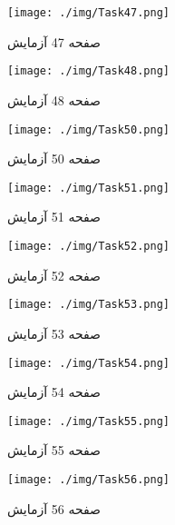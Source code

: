  
\begin{figure}[htpb]
\centering
\texttt{[image: ./img/Task47.png]}
\caption{ صفحه 47 آزمایش }
\label{fig:Task47}
\end{figure}
 
 
\begin{figure}[htpb]
\centering
\texttt{[image: ./img/Task48.png]}
\caption{ صفحه 48 آزمایش }
\label{fig:Task48}
\end{figure}
 

\begin{figure}[htpb]
\centering
\texttt{[image: ./img/Task50.png]}
\caption{ صفحه 50 آزمایش }
\label{fig:Task50}
\end{figure}
 
 
\begin{figure}[htpb]
\centering
\texttt{[image: ./img/Task51.png]}
\caption{ صفحه 51 آزمایش }
\label{fig:Task51}
\end{figure}
 
 
\begin{figure}[htpb]
\centering
\texttt{[image: ./img/Task52.png]}
\caption{ صفحه 52 آزمایش }
\label{fig:Task52}
\end{figure}
 
 
\begin{figure}[htpb]
\centering
\texttt{[image: ./img/Task53.png]}
\caption{ صفحه 53 آزمایش }
\label{fig:Task53}
\end{figure}
 
 
\begin{figure}[htpb]
\centering
\texttt{[image: ./img/Task54.png]}
\caption{ صفحه 54 آزمایش }
\label{fig:Task54}
\end{figure}
 
 
\begin{figure}[htpb]
\centering
\texttt{[image: ./img/Task55.png]}
\caption{ صفحه 55 آزمایش }
\label{fig:Task55}
\end{figure}
 
 
\begin{figure}[htpb]
\centering
\texttt{[image: ./img/Task56.png]}
\caption{ صفحه 56 آزمایش }
\label{fig:Task56}
\end{figure}
 
